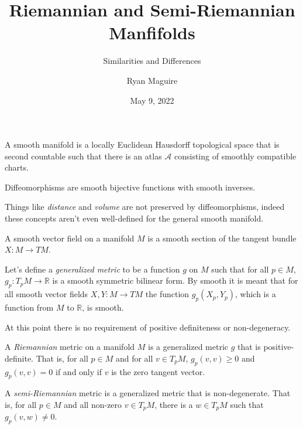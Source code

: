 \documentclass{beamer}
\title{Riemannian and Semi-Riemannian Manfifolds}
\subtitle{Similarities and Differences}
\author{Ryan Maguire}
\date{May 9, 2022}
\begin{document}
    \maketitle
    \begin{frame}
        A smooth manifold is a locally Euclidean Hausdorff topological space
        that is second countable such that there is an atlas $\mathcal{A}$
        consisting of smoothly compatible charts.
        \par\hfill\par
        Diffeomorphisms are
        smooth bijective functions with smooth inverses.
        \par\hfill\par
        Things like \textit{distance} and \textit{volume} are not preserved by
        diffeomorphisms, indeed these concepts aren't even well-defined for
        the general smooth manifold.
    \end{frame}
    \begin{frame}
        A smooth vector field on a manifold $M$ is a smooth section of the
        tangent bundle $X:M\rightarrow{TM}$.
        \par\hfill\par
        Let's define a
        \textit{generalized metric} to be a function $g$ on $M$ such that for
        all $p\in{M}$, $g_{p}:T_{p}M\rightarrow\mathbb{R}$ is a smooth
        symmetric bilinear form. By smooth it is meant that for all smooth
        vector fields $X,Y:M\rightarrow{TM}$ the function
        $g_{p}(X_{p},Y_{p})$, which is a function from $M$ to $\mathbb{R}$, is
        smooth.
        \par\hfill\par
        At this point there is no requirement of positive definiteness
        or non-degeneracy.
    \end{frame}
    \begin{frame}
        A \textit{Riemannian} metric on a manifold $M$ is a generalized metric
        $g$ that is positive-definite. That is, for all $p\in{M}$ and for all
        $v\in{T}_{p}M$, $g_{p}(v,v)\geq{0}$ and $g_{p}(v,v)=0$ if and only if
        $v$ is the zero tangent vector.
        \par\hfill\par
        A \textit{semi-Riemannian} metric is a generalized metric that is
        non-degenerate. That is, for all $p\in{M}$ and all non-zero
        $v\in{T}_{p}M$, there is a $w\in{T}_{p}M$ such that
        $g_{p}(v,w)\ne{0}$.
    \end{frame}
\end{document}
